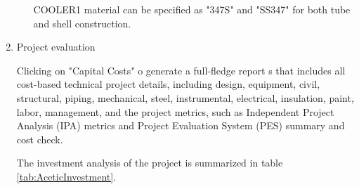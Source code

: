 \begin{enumerate}[label=\textbf{Step \arabic{enumi}}:,ref=Step \arabic{enumi}]
\begin{itemize}
		COOLER1 material can be specified as "347S" and "SS347" for both tube and shell construction.
		
	\end{itemize}
	
	\item Project evaluation \label{ste:ProjectEvaluation}
	
	Clicking on "Capital Costs" o generate a full-fledge report s that includes all cost-based technical project details, including design, equipment, civil, structural, piping, mechanical, steel, instrumental, electrical, insulation, paint, labor, management, and the project metrics, such as Independent Project Analysis (IPA) metrics and Project Evaluation System (PES) summary and cost check. 
	
	The investment analysis of the project is summarized in table \ref{tab:AceticInvestment}.
	

\end{enumerate}
